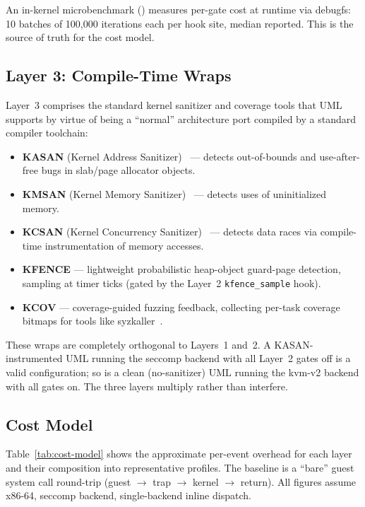 An in-kernel microbenchmark
() measures per-gate
cost at runtime via debugfs: 10 batches of 100{,}000 iterations each per hook
site, median reported.  This is the source of truth for the cost model.


\subsection{Layer 3: Compile-Time Wraps}
\label{sec:layer3}

Layer~3 comprises the standard kernel sanitizer and coverage tools that UML
supports by virtue of being a ``normal'' architecture port compiled by a
standard compiler toolchain:

\begin{itemize}[leftmargin=2em, itemsep=2pt]
\item \textbf{KASAN} (Kernel Address Sanitizer)~\cite{kasan} --- detects
  out-of-bounds and use-after-free bugs in slab/page allocator objects.
\item \textbf{KMSAN} (Kernel Memory Sanitizer)~\cite{kmsan} --- detects
  uses of uninitialized memory.
\item \textbf{KCSAN} (Kernel Concurrency Sanitizer)~\cite{kcsan} --- detects
  data races via compile-time instrumentation of memory accesses.
\item \textbf{KFENCE} --- lightweight probabilistic heap-object guard-page
  detection, sampling at timer ticks (gated by the Layer~2
  \texttt{kfence\_sample} hook).
\item \textbf{KCOV} --- coverage-guided fuzzing feedback, collecting per-task
  coverage bitmaps for tools like syzkaller~\cite{syzkaller}.
\end{itemize}

These wraps are completely orthogonal to Layers~1 and~2.  A KASAN-instrumented
UML running the seccomp backend with all Layer~2 gates off is a valid
configuration; so is a clean (no-sanitizer) UML running the kvm-v2 backend with
all gates on.  The three layers multiply rather than interfere.


\subsection{Cost Model}
\label{sec:cost-model}

Table~\ref{tab:cost-model} shows the approximate per-event overhead for each
layer and their composition into representative profiles.  The baseline is a
``bare'' guest system call round-trip (guest $\to$ trap $\to$ kernel
$\to$ return).  All figures assume x86-64, seccomp backend, single-backend
inline dispatch.


